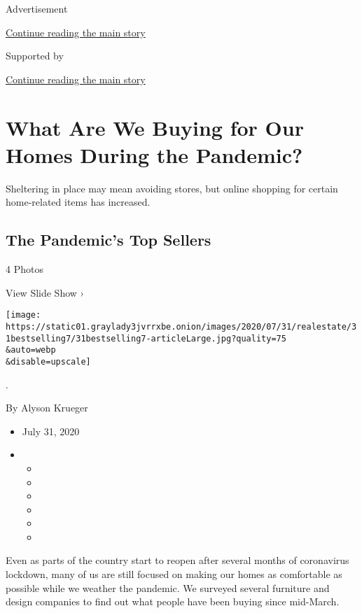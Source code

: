 Advertisement

\protect\hyperlink{after-top}{Continue reading the main story}

Supported by

\protect\hyperlink{after-sponsor}{Continue reading the main story}

\hypertarget{what-are-we-buying-for-our-homes-during-the-pandemic}{%
\section{What Are We Buying for Our Homes During the
Pandemic?}\label{what-are-we-buying-for-our-homes-during-the-pandemic}}

Sheltering in place may mean avoiding stores, but online shopping for
certain home-related items has increased.

\href{https://www.nytimes3xbfgragh.onion/slideshow/2020/07/31/realestate/the-pandemics-top-sellers.html}{}

\hypertarget{the-pandemics-top-sellers}{%
\subsection{The Pandemic's Top
Sellers}\label{the-pandemics-top-sellers}}

4 Photos

View Slide Show ›

\texttt{[image: https://static01.graylady3jvrrxbe.onion/images/2020/07/31/realestate/31bestselling7/31bestselling7-articleLarge.jpg?quality=75\\\&auto=webp\\\&disable=upscale]}

.

By Alyson Krueger

\begin{itemize}
\item
  July 31, 2020
\item
  \begin{itemize}
  \item
  \item
  \item
  \item
  \item
  \item
  \end{itemize}
\end{itemize}

Even as parts of the country start to reopen after several months of
coronavirus lockdown, many of us are still focused on making our homes
as comfortable as possible while we weather the pandemic. We surveyed
several furniture and design companies to find out what people have been
buying since mid-March.

